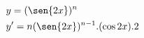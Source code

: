 \begin{ex}
\begin{align}
&y=(\sen{2x})^n\nonumber\\
&y'=n(\sen{2x})^{n-1}.(\cos{2x}).2\nonumber
\end{align}
\end{ex}